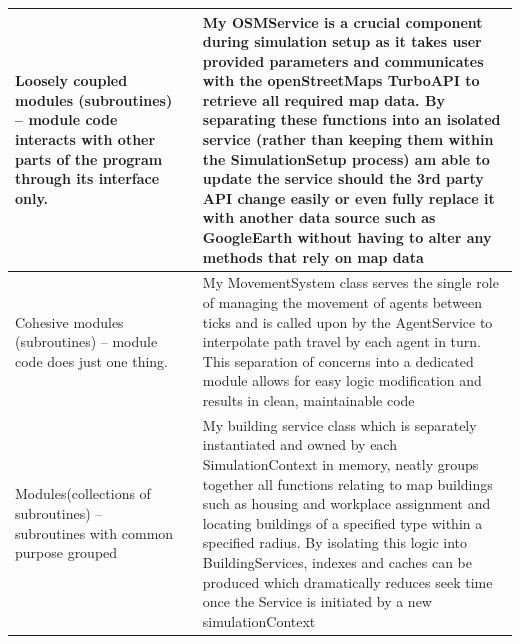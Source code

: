 \begin{longtable}{|L{3.5cm}|L{4.5cm}|L{5.5cm}|}
Loosely coupled modules (subroutines) – module code interacts with other
parts of the program through its interface only. & 
 & My OSMService is a crucial component during simulation setup as it takes user provided parameters and communicates with the openStreetMaps TurboAPI to retrieve all required map data. By separating these functions into an isolated service (rather than keeping them within the SimulationSetup process) am able to update the service should the 3rd party API change easily or even fully replace it with another data source such as GoogleEarth without having to alter any methods that rely on map data \\
\hline

Cohesive modules (subroutines) – module code does just one thing. & 
 & My MovementSystem class serves the single role of managing the movement of agents between ticks and is called upon by the AgentService to interpolate path travel by each agent in turn. This separation of concerns into a dedicated module allows for easy logic modification and results in clean, maintainable code\\
\hline

Modules(collections of subroutines) – subroutines with common purpose
grouped &  & My building service class which is separately instantiated and owned by each SimulationContext in memory, neatly groups together all functions relating to map buildings such as housing and workplace assignment and locating buildings of a specified type within a specified radius. By isolating this logic into BuildingServices, indexes and caches can be produced which dramatically reduces seek time once the Service is initiated by a new simulationContext\\
\hline


\end{longtable}
